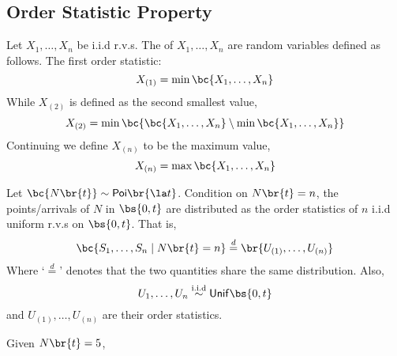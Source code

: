 \documentclass{article}
\newcommand{\Poi}{\mathsf{Poi}}
\newcommand{\Unif}{\mathsf{Unif}}
\begin{document}
    \subsection{Order Statistic Property}

    Let $X_1, \ldots, X_n$ be i.i.d r.v.s. The  of $X_1, \ldots, X_n$ are random variables defined as follows. The first order statistic:
    \[ X_{(1)} = \min\bc{X_1, \ldots, X_n} \]
    While $X_{(2)}$ is defined as the second smallest value,
    \[ X_{(2)} = \min\bc{\bc{X_1, \ldots, X_n} \setminus \min\bc{{X_1, \ldots, X_n}}} \]
    Continuing we define $X_{(n)}$ to be the maximum value,
    \[ X_{(n)} = \max\bc{X_1, \ldots, X_n} \]
    \begin{theorem}
        Let $\bc{N\br{t}} \sim \Poi\br{\la t}$. Condition on $N\br{t} = n$, the points/arrivals of $N$ in $\bs{0, t}$ are distributed as the order statistics of $n$ i.i.d uniform r.v.s on $\bs{0, t}$. That is,
        \[ \bc{S_1, \ldots, S_n \mid N\br{t} = n} \stackrel{d}{=} \br{U_{(1)}, \ldots, U_{(n)}} \]
        Where `$\stackrel{d}{=}$' denotes that the two quantities share the same distribution. Also,
        \[ U_{1}, \ldots, U_{n} \stackrel{\text{i.i.d}}{\sim} \Unif\bs{0,t} \]
        and $U_{(1)}, \ldots, U_{(n)}$ are their order statistics.
    \end{theorem}

    \begin{example}
        Given $N\br{t} = 5$,
        \begin{center}
        \end{center}
    \end{example}
\end{document}
